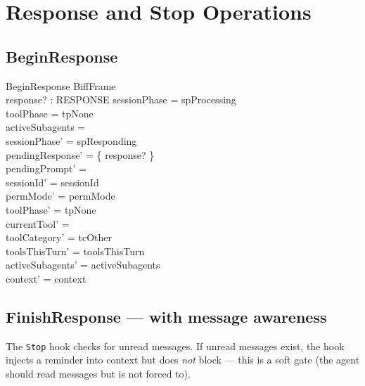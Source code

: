 \documentclass[a4paper,10pt,fleqn]{article}
\begin{document}
\section{Response and Stop Operations}

\subsection{BeginResponse}

\begin{schema}{BeginResponse}
  BiffFrame \\
  response? : RESPONSE
  \where
  sessionPhase = spProcessing \\
  toolPhase = tpNone \\
  activeSubagents = \emptyset \\
  sessionPhase' = spResponding \\
  pendingResponse' = \{ response? \} \\
  pendingPrompt' = \emptyset \\
  sessionId' = sessionId \\
  permMode' = permMode \\
  toolPhase' = tpNone \\
  currentTool' = \emptyset \\
  toolCategory' = tcOther \\
  toolsThisTurn' = toolsThisTurn \\
  activeSubagents' = activeSubagents \\
  context' = context
\end{schema}

\subsection{FinishResponse --- with message awareness}

The \texttt{Stop} hook checks for unread messages. If unread
messages exist, the hook injects a reminder into context but
does \emph{not} block --- this is a soft gate (the agent should
read messages but is not forced to).
\end{document}
